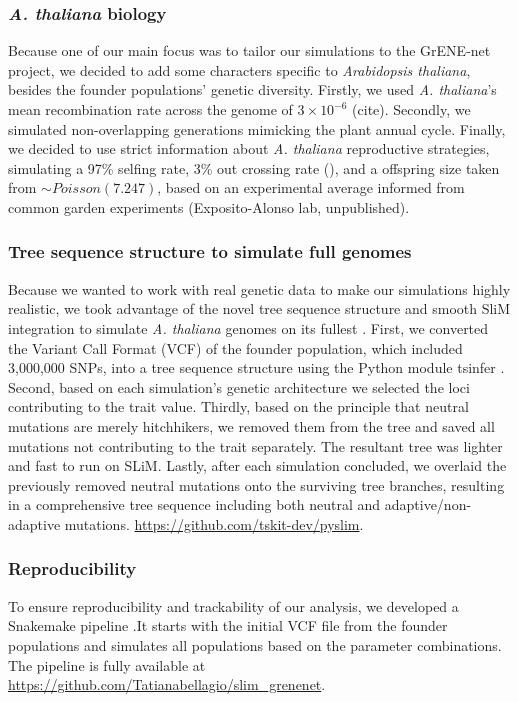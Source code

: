 \documentclass{article}
\begin{document}
\subsubsection{\textit{A. thaliana} biology}
Because one of our main focus was to tailor our simulations to the GrENE-net project, we decided to add some characters specific to \textit{Arabidopsis thaliana}, besides the founder populations' genetic diversity. Firstly, we used \textit{A. thaliana}'s mean recombination rate across the genome of $3 \times 10^{-6}$ (cite). Secondly, we simulated non-overlapping generations mimicking the plant annual cycle. Finally, we decided to use strict information about \textit{A. thaliana} reproductive strategies, simulating a 97\% selfing rate, 3\% out crossing rate (\citep{Platt2010-hy}), and a offspring size taken from $\sim Poisson(7.247)$, based on an experimental average informed from common garden experiments (Exposito-Alonso lab, unpublished). 

\subsubsection{Tree sequence structure to simulate full genomes}
Because we wanted to work with real genetic data to make our simulations highly realistic, we took advantage of the novel tree sequence structure and smooth SliM integration to simulate \textit{A. thaliana} genomes on its fullest \citep{Kelleher2018-jb, Haller2019-lm}. First, we converted the Variant Call Format (VCF) of the founder population, which included 3,000,000 SNPs, into a tree sequence structure using the Python module tsinfer \citep{Kelleher2019-ev}. Second, based on each simulation's genetic architecture we selected the loci contributing to the trait value. Thirdly, based on the principle that neutral mutations are merely hitchhikers, we removed them from the tree and saved all mutations not contributing to the trait separately. The resultant tree was lighter and fast to run on SLiM. Lastly, after each simulation concluded, we overlaid the previously removed neutral mutations onto the surviving tree branches, resulting in a comprehensive tree sequence including both neutral and adaptive/non-adaptive mutations.
\url{https://github.com/tskit-dev/pyslim}. 

\subsubsection{Reproducibility}
To ensure reproducibility and trackability of our analysis, we developed a Snakemake pipeline \citep{Molder2021-ho}.It starts with the initial VCF file from the founder populations and simulates all populations based on the parameter combinations. The pipeline is fully available at \url{https://github.com/Tatianabellagio/slim_grenenet}.
\end{document}
